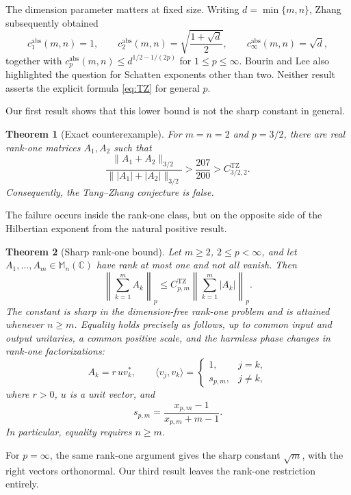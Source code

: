 \documentclass[11pt,reqno]{amsart}
\newtheorem{theorem}{Theorem}[section]
\theoremstyle{remark}
\newcommand{\C}{\mathbb C}
\newcommand{\M}{\mathbb M}
\newcommand{\TZ}{C^{\mathrm{TZ}}}
\begin{document}
The dimension parameter matters at fixed size.  Writing
\(d=\min\{m,n\}\), Zhang \cite{Zhang_2026} subsequently obtained
\[
 c_1^{\mathrm{abs}}(m,n)=1,\qquad
 c_2^{\mathrm{abs}}(m,n)=\sqrt{\frac{1+\sqrt d}{2}},\qquad
 c_\infty^{\mathrm{abs}}(m,n)=\sqrt d,
\]
together with
\(c_p^{\mathrm{abs}}(m,n)\le
d^{1/2-1/(2p)}\) for \(1\le p\le\infty\).
Bourin and Lee \cite{Bourin_2026} also highlighted the question for
Schatten exponents other than two.  Neither result asserts the explicit
formula \eqref{eq:TZ} for general \(p\).

Our first result shows that this lower bound is not the sharp constant in
general.

\begin{theorem}[Exact counterexample]\label{thm:counterexample}
For \(m=n=2\) and \(p=3/2\), there are real rank-one matrices \(A_1,A_2\)
such that
\[
 \frac{\|A_1+A_2\|_{3/2}}
      {\||A_1|+|A_2|\|_{3/2}}
 >
 \frac{207}{200}
 >
 \TZ_{3/2,2}.
\]
Consequently, the Tang--Zhang conjecture is false.
\end{theorem}

The failure occurs inside the rank-one class, but on the opposite side of
the Hilbertian exponent from the natural positive result.

\begin{theorem}[Sharp rank-one bound]\label{thm:rank-one}
Let \(m\ge2\), \(2\le p<\infty\), and let
\(A_1,\ldots,A_m\in\M_n(\C)\) have rank at most one and not all vanish.
Then
\begin{equation}\label{eq:rank-one-bound}
 \left\|\sum_{k=1}^m A_k\right\|_p
 \le
 \TZ_{p,m}
 \left\|\sum_{k=1}^m |A_k|\right\|_p .
\end{equation}
The constant is sharp in the dimension-free rank-one problem and is attained
whenever \(n\ge m\).  Equality holds precisely as
follows, up to common input and output unitaries, a common positive scale,
and the harmless phase changes in rank-one factorizations:
\[
 A_k=r\,u v_k^*,\qquad
 \langle v_j,v_k\rangle=
 \begin{cases}
 1,&j=k,\\
 s_{p,m},&j\ne k,
 \end{cases}
\]
where \(r>0\), \(u\) is a unit vector, and
\[
 s_{p,m}=\frac{x_{p,m}-1}{x_{p,m}+m-1}.
\]
In particular, equality requires \(n\ge m\).
\end{theorem}

For \(p=\infty\), the same rank-one argument gives the sharp constant
\(\sqrt m\), with the right vectors orthonormal.  Our third result leaves
the rank-one restriction entirely.
\end{document}
